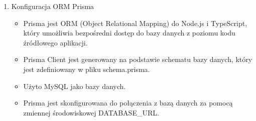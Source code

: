 \begin{enumerate}
\begin{itemize}
        \end{itemize}
    \item Konfiguracja ORM Prisma
        \begin{itemize}
            \item Prisma jest ORM (Object Relational Mapping) do Node.js i TypeScript, który umożliwia bezpośredni dostęp do bazy danych z poziomu kodu źródłowego aplikacji.
            \item Prisma Client jest generowany na podstawie schematu bazy danych, który jest zdefiniowany w pliku schema.prisma.
            \item Użyto MySQL jako bazy danych.
            \item Prisma jest skonfigurowana do połączenia z bazą danych za pomocą zmiennej środowiskowej DATABASE\_URL.
        \end{itemize}
\end{enumerate}